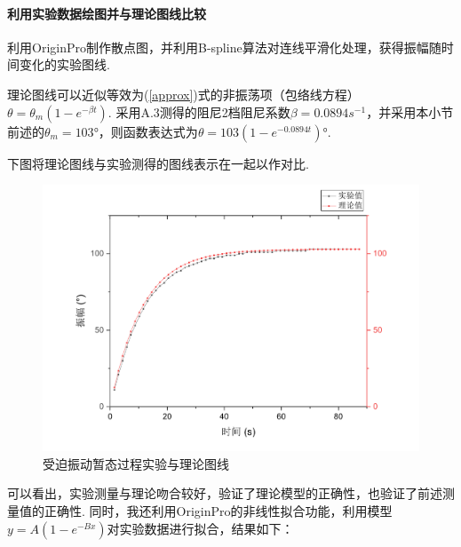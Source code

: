 \documentclass[UTF8]{ctexart}
\begin{document}
\paragraph{利用实验数据绘图并与理论图线比较}\quad\par
利用OriginPro制作散点图，并利用B-spline算法对连线平滑化处理，获得振幅随时间变化的实验图线.\par
理论图线可以近似等效为(\ref{approx})式的非振荡项（包络线方程）$\displaystyle{\theta=\theta_m(1-e^{-\beta t})}$. 采用A.3测得的阻尼2档阻尼系数$\beta=0.0894s^{-1}$，并采用本小节前述的$\theta_m=103$°，则函数表达式为$\theta=103(1-e^{-0.0894t})$°.\par
下图将理论图线与实验测得的图线表示在一起以作对比.
\begin{figure}[H]\begin{center}
\includegraphics[scale=0.4]{transient.pdf}\vspace{-5mm}
\caption{受迫振动暂态过程实验与理论图线}
\end{center}\end{figure}
可以看出，实验测量与理论吻合较好，验证了理论模型的正确性，也验证了前述测量值的正确性.
同时，我还利用OriginPro的非线性拟合功能，利用模型$y=A(1-e^{-Bx})$对实验数据进行拟合，结果如下：
\end{document}
